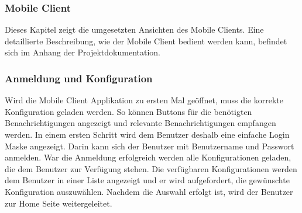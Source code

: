 \subsubsection{Mobile Client}\label{subsec:mobile-client-realisation}

Dieses Kapitel zeigt die umgesetzten Ansichten des Mobile Clients.
Eine detaillierte Beschreibung, wie der Mobile Client bedient werden kann, befindet sich im Anhang der Projektdokumentation.

\subsubsection*{Anmeldung und Konfiguration}

Wird die Mobile Client Applikation zu ersten Mal geöffnet, muss die korrekte Konfiguration geladen werden.
So können Buttons für die benötigten Benachrichtigungen angezeigt und relevante Benachrichtigungen empfangen werden.
In einem ersten Schritt wird dem Benutzer deshalb eine einfache Login Maske angezeigt.
Darin kann sich der Benutzer mit Benutzername und Passwort anmelden.
War die Anmeldung erfolgreich werden alle Konfigurationen geladen, die dem Benutzer zur Verfügung stehen.
Die verfügbaren Konfigurationen werden dem Benutzer in einer Liste angezeigt und er wird aufgefordert, die gewünschte Konfiguration auszuwählen.
Nachdem die Auswahl erfolgt ist, wird der Benutzer zur Home Seite weitergeleitet.

